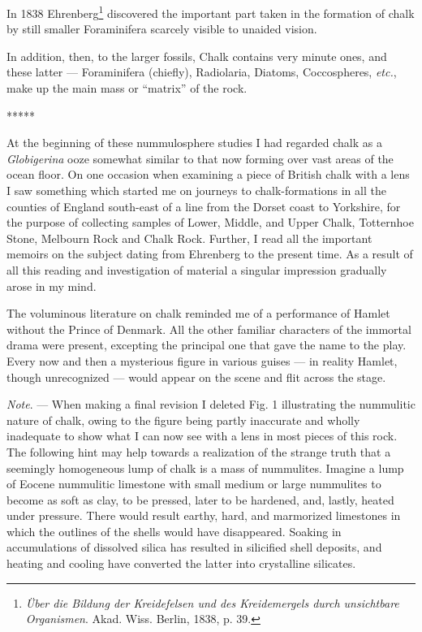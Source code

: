 \documentclass[a4paper, 12pt, oneside]{article}
\begin{document}
In 1838 Ehrenberg\footnote{\emph{Über die Bildung der Kreidefelsen und des Kreidemergels durch unsichtbare Organismen}. Akad. Wiss. Berlin, 1838, p. 39.} discovered the important part taken in the formation of chalk by still smaller Foraminifera scarcely visible to unaided vision.

In addition, then, to the larger fossils, Chalk contains very minute ones, and these latter --- Foraminifera (chiefly), Radiolaria, Diatoms, Coccospheres, \emph{etc.}, make up the main mass or ``matrix'' of the rock.

\centerline{*\hspace{15mm}*\hspace{15mm}*\hspace{15mm}*\hspace{15mm}*}
\bigskip

At the beginning of these nummulosphere studies I had regarded chalk as a \emph{Globigerina} ooze somewhat similar to that now forming over vast areas of the ocean floor. On one occasion when examining a piece of British chalk with a lens I saw something which started me on journeys to chalk-formations in all the counties of England south-east of a line from the Dorset coast to Yorkshire, for the purpose of collecting samples of Lower, Middle, and Upper Chalk, Totternhoe Stone, Melbourn Rock and Chalk Rock. Further, I read all the important memoirs on the subject dating from Ehrenberg to the present time. As a result of all this reading and investigation of material a singular impression gradually arose in my mind.

The voluminous literature on chalk reminded me of a performance of Hamlet without the Prince of Denmark. All the other familiar characters of the immortal drama were present, excepting the principal one that gave the name to the play. Every now and then a mysterious figure in various guises --- in reality Hamlet, though unrecognized --- would appear on the scene and flit across the stage.

\emph{Note}. --- When making a final revision I deleted Fig. 1 illustrating the nummulitic nature of chalk, owing to the figure being partly inaccurate and wholly inadequate to show what I can now see with a lens in most pieces of this rock. The following hint may help towards a realization of the strange truth that a seemingly homogeneous lump of chalk is a mass of nummulites. Imagine a lump of Eocene nummulitic limestone with small medium or large nummulites to become as soft as clay, to be pressed, later to be hardened, and, lastly, heated under pressure. There would result earthy, hard, and marmorized limestones in which the outlines of the shells would have disappeared. Soaking in accumulations of dissolved silica has resulted in silicified shell deposits, and heating and cooling have converted the latter into crystalline silicates.
\end{document}
